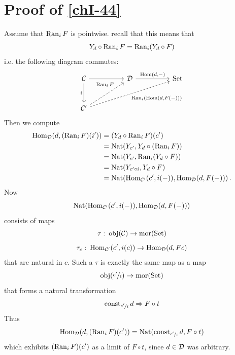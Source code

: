     \section{Proof of \ref{chI-44}}\label{chI-46}
        Assume that $\operatorname{Ran}_i F$ is pointwise. recall that this means that
        \begin{equation*}
            Y_d \circ \operatorname{Ran}_i F = \operatorname{Ran}_i(Y_d \circ F)
        \end{equation*}
        i.e. the following diagram commutes:
        \begin{equation*}
            \begin{tikzcd}[column sep=huge, row sep=large]
                \Cc \arrow[r] \arrow[d, "i"']                                                        & \Dd \arrow[r, "{\Hom(d, -)}"] & \Set \\
                \Cc' \arrow[ru, "\Ran_i F" near end, dashed] \arrow[rru, "{\Ran_i (\Hom(d, F(-)))}"', dashed] &                               &     
            \end{tikzcd}
        \end{equation*}
        Then we compute
        \begin{align*}
            \operatorname{Hom}_{\mathcal{D}}(d, (\operatorname{Ran}_i F)(i')) &= (Y_d \circ \operatorname{Ran}_i F)(c')\\
                                        &= \operatorname{Nat}(Y_{c'}, Y_d \circ (\operatorname{Ran}_i F)) \\
                                        &= \operatorname{Nat}(Y_{c'}, \operatorname{Ran}_i (Y_d \circ F)) \\
                                        &= \operatorname{Nat}(Y_{c' \circ i}, Y_d \circ F) \\        &= \operatorname{Nat}(\operatorname{Hom}_{\mathcal{C}'}(c', i(-)), \operatorname{Hom}_{\mathcal{D}}(d, F(-)))\,.
        \end{align*}
        Now
        \begin{equation*}
            \operatorname{Nat}(\operatorname{Hom}_{\mathcal{C}'}(c', i(-)), \operatorname{Hom}_{\mathcal{D}}(d, F(-)))
        \end{equation*}
        consists of maps
        \begin{equation*}
            \tau \,\colon \operatorname{obj}(\mathcal{C}) \to \operatorname{mor}(\operatorname{Set})
        \end{equation*}
        \begin{equation*}
            \tau_{c} \,\colon \operatorname{Hom}_{\mathcal{C}'}(c', i(c)) \to \operatorname{Hom}_{\mathcal{D}}(d, Fc) 
        \end{equation*}
        that are natural in $c$. Such a $\tau$ is exactly the same map as a map
        \begin{equation*}
            \operatorname{obj}(\nicefrac{c'}{i}) \to \operatorname{mor}(\operatorname{Set})
        \end{equation*}
        that forms a natural transformation
        \begin{equation*}
            \operatorname{const}_{\nicefrac{c'}{i}}d \Rightarrow F \circ t
        \end{equation*}
        Thus
        \begin{equation*}
            \operatorname{Hom}_{\mathcal{D}}(d, (\operatorname{Ran}_i F)(c')) = \operatorname{Nat}(\operatorname{const}_{\nicefrac{c'}{i}}d, F \circ t)
        \end{equation*}
        which exhibits $(\operatorname{Ran}_i F)(c')$ as a limit of $F \circ t$, since $d \in \mathcal{D}$ was arbitrary.

